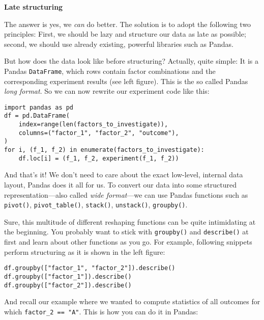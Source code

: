 \textrm{\textbf{Late structuring}}
\vspace{6 pt}

The answer is yes, we \emph{can} do better.
The solution is to adopt the following two principles:
First, we should be lazy and structure our data as late as possible;
second, we should use already existing, powerful libraries such as Pandas.

\vspace{3 pt}

But how does the data look like before structuring?
Actually, quite simple:
It is a Pandas \lstinline{DataFrame}, which rows contain
factor combinations and the corresponding experiment results (see left figure).
This is the so called Pandas \emph{long format}.
So we can now rewrite our experiment code like this:

\begin{lstlisting}
import pandas as pd
df = pd.DataFrame(
    index=range(len(factors_to_investigate)),
    columns=("factor_1", "factor_2", "outcome"),
)
for i, (f_1, f_2) in enumerate(factors_to_investigate):
    df.loc[i] = (f_1, f_2, experiment(f_1, f_2))
\end{lstlisting}

\vspace{-22 pt}

And that's it! We don't need to care about the exact low-level,
internal data layout, Pandas does it all for us.
To convert our data into some structured
representation---also called \emph{wide format}---we
can use Pandas functions such as \lstinline{pivot()}, \lstinline{pivot_table()},
\lstinline{stack()}, \lstinline{unstack()}, \lstinline{groupby()}.

\vspace{3 pt}

Sure, this multitude of different reshaping functions
can be quite intimidating at the beginning.
You probably want to stick with \lstinline{groupby()} and \lstinline{describe()} at first
and learn about other functions as you go.
For example, following snippets perform structuring as it is shown in the left figure:

\begin{lstlisting}
df.groupby(["factor_1", "factor_2"]).describe()
df.groupby(["factor_1"]).describe()
df.groupby(["factor_2"]).describe()
\end{lstlisting}

\vspace{-22 pt}

And recall our example where we wanted to compute statistics
of all outcomes for which \lstinline{factor_2 == "A"}.
This is how you can do it in Pandas:

